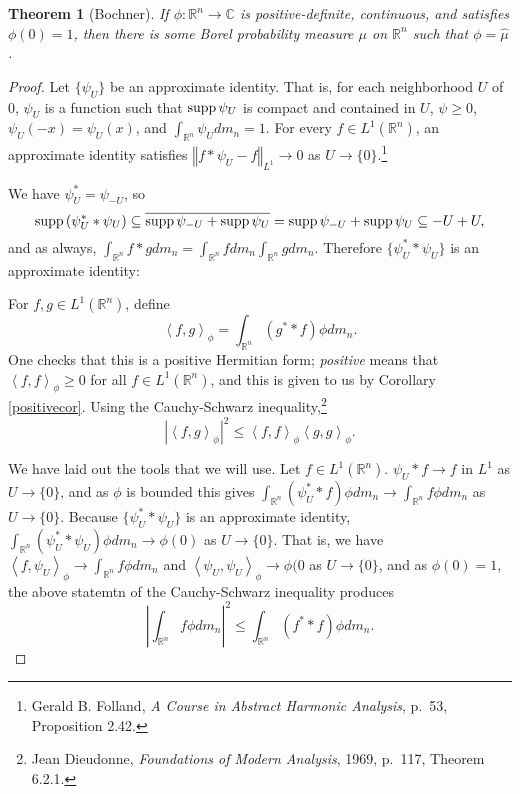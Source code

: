 \documentclass{article}
\newcommand{\inner}[2]{\left\langle #1, #2 \right\rangle}
\newcommand{\supp}{\ensuremath\mathrm{supp}\,}
\newcommand{\norm}[1]{\left\Vert #1 \right\Vert}
\newtheorem{theorem}{Theorem}
\theoremstyle{definition}
\begin{document}
\begin{theorem}[Bochner]
If $\phi:\mathbb{R}^n \to \mathbb{C}$ is positive-definite, continuous, and satisfies $\phi(0)=1$, then there is some
Borel probability measure $\mu$ on $\mathbb{R}^n$ such that $\phi=\hat{\mu}$.
\end{theorem}
\begin{proof}
Let $\{\psi_U\}$ be an approximate identity. That is, for each  neighborhood $U$ of $0$, $\psi_U$ is a function such that
$\supp \psi_U$ is compact and contained in $U$,
$\psi \geq
0$,
$\psi_U(-x)=\psi_U(x)$, and  $\int_{\mathbb{R}^n} \psi_U dm_n =1$. For every $f \in L^1(\mathbb{R}^n)$, an approximate identity satisfies $\norm{f*\psi_U -f}_{L^1}\to 0$ as
$U \to \{0\}$.\footnote{Gerald B. Folland, {\em A Course in Abstract Harmonic Analysis}, p.~53, Proposition 2.42.}

We have $\psi_U^*=\psi_{-U}$, so
\[
\supp (\psi_U^* * \psi_U) \subseteq \overline{\supp \psi_{-U} + \supp \psi_U} = \supp \psi_{-U} + \supp \psi_U \subseteq -U +U,
\]
and as always, $\int_{\mathbb{R}^n} f*g dm_n
=\int_{\mathbb{R}^n} f dm_n \int_{\mathbb{R}^n} gdm_n$.
Therefore $\{\psi_U^* * \psi_U\}$ is an approximate identity:

For $f,g \in L^1(\mathbb{R}^n)$, define
\[
\inner{f}{g}_\phi = \int_{\mathbb{R}^n} (g^* * f) \phi dm_n.
\]
One checks that this is a positive Hermitian form; {\em positive} means that $\inner{f}{f}_\phi \geq 0$ for all $f \in L^1(\mathbb{R}^n)$, and this
is given to us by Corollary \ref{positivecor}.
Using the Cauchy-Schwarz inequality,\footnote{Jean Dieudonne, {\em Foundations of Modern Analysis}, 1969, p.~117, Theorem 6.2.1.}
\[
|\inner{f}{g}_\phi|^2 \leq \inner{f}{f}_\phi \inner{g}{g}_\phi.
\]

We have  laid out the tools that we will use. Let $f \in L^1(\mathbb{R}^n)$. $\psi_U * f  \to f$ in $L^1$ as $U \to \{0\}$, and as $\phi$ is bounded
this gives $\int_{\mathbb{R}^n} (\psi_U^* * f) \phi dm_n \to \int_{\mathbb{R}^n} f\phi dm_n$ as $U \to \{0\}$. 
Because $\{\psi_U^* * \psi_U\}$ is an approximate identity, $\int_{\mathbb{R}^n} (\psi_U^* * \psi_U) \phi dm_n \to \phi(0)$ as $U \to \{0\}$. That is,
we have $\inner{f}{\psi_U}_\phi \to \int_{\mathbb{R}^n} f\phi dm_n$ and $\inner{\psi_U}{\psi_U}_\phi \to \phi(0$ as $U \to \{0\}$, and as $\phi(0)=1$,
the above statemtn of the Cauchy-Schwarz inequality produces
\begin{equation}
\left| \int_{\mathbb{R}^n} f\phi dm_n \right|^2 \leq \int_{\mathbb{R}^n} (f^* * f)\phi dm_n.
\label{sweetestimate}
\end{equation}


\end{proof}
\end{document}
